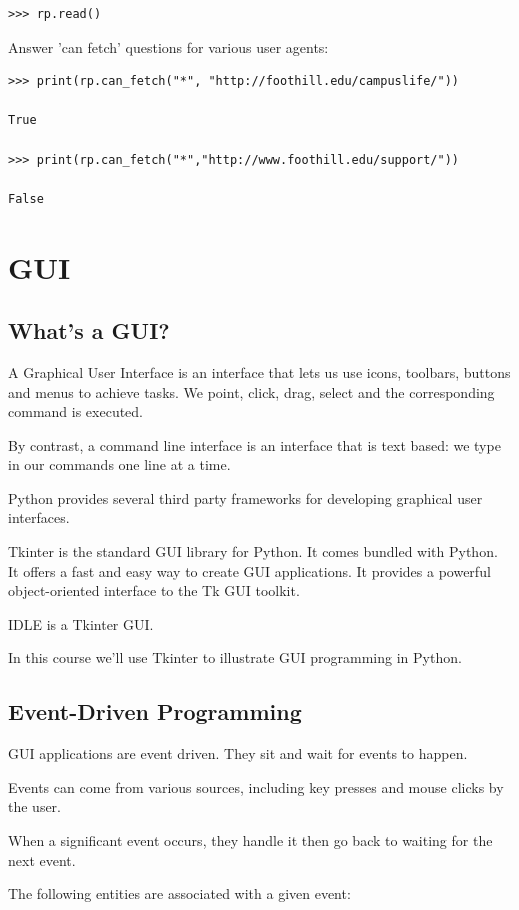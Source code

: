 \documentclass{article}
\begin{document}
\begin{lstlisting}
>>> rp.read() 
\end{lstlisting}

Answer 'can fetch' questions for various user agents: 

\begin{lstlisting}
>>> print(rp.can_fetch("*", "http://foothill.edu/campuslife/"))

True

>>> print(rp.can_fetch("*","http://www.foothill.edu/support/"))

False
\end{lstlisting}

\section{GUI}
\subsection{What's a GUI?}
A Graphical User Interface is an interface that lets us use icons, toolbars, buttons and menus to achieve tasks.  We point, click, drag, select and the corresponding command is executed.

By contrast, a command line interface is an interface that is text based:  we type in our commands one line at a time.

Python provides several third party frameworks for developing graphical user interfaces. 

Tkinter is the standard GUI library for Python.  It comes bundled with Python.  It offers a fast and easy way to create GUI applications.   It provides a powerful object-oriented interface to the Tk GUI toolkit.

IDLE is a Tkinter GUI.

In this course we'll use Tkinter to illustrate GUI programming in Python.

\subsection{Event-Driven Programming}
GUI applications are event driven. They sit and wait for events to happen.

Events can come from various sources, including key presses and mouse clicks by the user.

When a significant event occurs, they handle it then go back to waiting for the next event.

The following entities are associated with a given event:
\end{document}
